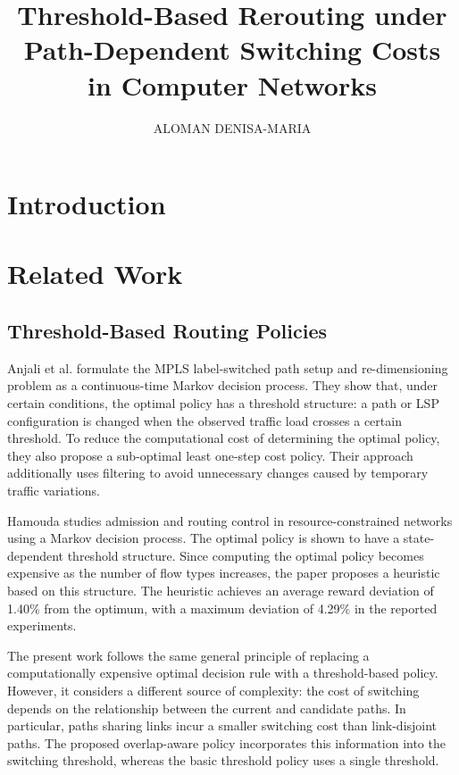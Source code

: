 \documentclass{amsart}
\providecommand{\subjclassCR}[1]{}
\begin{document}
\title[Threshold Rerouting with Path-Dependent Costs]{Threshold-Based Rerouting under Path-Dependent Switching Costs in Computer Networks}

\author{ALOMAN DENISA-MARIA}


\subjclassCR{C.2.1 [\textbf{Computer-Communication Networks}]: \textit{Network Architecture and Design}; G.3 [\textbf{Probability and Statistics}]: \textit{Markov processes}}


\maketitle
\section{Introduction}
\section{Related Work}
\label{sec:related-work}

\subsection{Threshold-Based Routing Policies}

Anjali et al. \cite{anjali2002} formulate the MPLS label-switched path setup and re-dimensioning problem as a continuous-time Markov decision process. They show that, under certain conditions, the optimal policy has a threshold structure: a path or LSP configuration is changed when the observed traffic load crosses a certain threshold. To reduce the computational cost of determining the optimal policy, they also propose a sub-optimal least one-step cost policy. Their approach additionally uses filtering to avoid unnecessary changes caused by temporary traffic variations.

Hamouda \cite{hamouda2020} studies admission and routing control in resource-constrained networks using a Markov decision process. The optimal policy is shown to have a state-dependent threshold structure. Since computing the optimal policy becomes expensive as the number of flow types increases, the paper proposes a heuristic based on this structure. The heuristic achieves an average reward deviation of 1.40\% from the optimum, with a maximum deviation of 4.29\% in the reported experiments.

The present work follows the same general principle of replacing a computationally expensive optimal decision rule with a threshold-based policy. However, it considers a different source of complexity: the cost of switching depends on the relationship between the current and candidate paths. In particular, paths sharing links incur a smaller switching cost than link-disjoint paths. The proposed overlap-aware policy incorporates this information into the switching threshold, whereas the basic threshold policy uses a single threshold.
\end{document}
